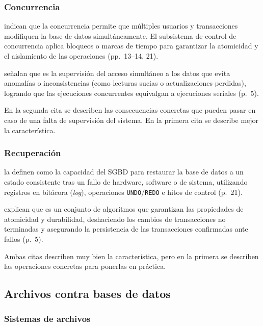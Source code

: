 \subsubsection{Concurrencia}

\textcite{elmasri_navathe} indican que la concurrencia permite que múltiples usuarios y transacciones modifiquen la base de datos simultáneamente. El subsistema de control de concurrencia aplica bloqueos o marcas de tiempo para garantizar la atomicidad y el aislamiento de las operaciones (pp.~13--14, 21).

\textcite{silberschatz_dbconcepts} señalan que es la supervisión del acceso simultáneo a los datos que evita anomalías o inconsistencias (como lecturas sucias o actualizaciones perdidas), logrando que las ejecuciones concurrentes equivalgan a ejecuciones seriales (p.~5).

En la segunda cita se describen las consecuencias concretas que pueden pasar en caso de una falta de supervisión del sistema. En la primera cita se describe mejor la característica.

\subsubsection{Recuperación}

\textcite{elmasri_navathe} la definen como la capacidad del SGBD para restaurar la base de datos a un estado consistente tras un fallo de hardware, software o de sistema, utilizando registros en bitácora (\textit{log}), operaciones \texttt{UNDO}/\texttt{REDO} e hitos de control (p.~21).

\textcite{silberschatz_dbconcepts} explican que es un conjunto de algoritmos que garantizan las propiedades de atomicidad y durabilidad, deshaciendo los cambios de transacciones no terminadas y asegurando la persistencia de las transacciones confirmadas ante fallos (p.~5).

Ambas citas describen muy bien la característica, pero en la primera se describen las operaciones concretas para ponerlas en práctica.

\subsection{Archivos contra bases de datos}

\subsubsection{Sistemas de archivos}

